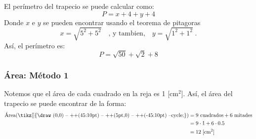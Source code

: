 \documentclass{cdplf-pauta}
\begin{document}
\raggedright
\begin{multicols}{2}

\pregunta
\begin{center}
\end{center}
El perímetro del trapecio se puede calcular como:
\begin{equation*}
    P = x + 4 + y + 4
\end{equation*}
Donde $x$ e $y$ se pueden encontrar usando el teorema de pitagoras
\begin{equation*}
    x = \sqrt{5^2 + 5^2} \quad \textrm{, y tambien,} \quad y = \sqrt{1^2 + 1^2} \;.
\end{equation*}
Así, el perímetro es:
\begin{equation*}
    P = \sqrt{50} + \sqrt{2} + 8
\end{equation*}
\subsubsection{Área: Método 1}
Notemos que el área de cada cuadrado en
la reja es 1 [$\textrm{cm}^2$]. Así, el área del trapecio se puede encontrar 
de la forma:
\setlength{\belowdisplayskip}{0pt}
\setlength{\belowdisplayshortskip}{0pt}
\begin{align*}
    \textrm{Área}(\raisebox{0pt}{\tikz[]{\draw (0,0) -- ++(45:10pt) -- ++(5pt,0) -- ++(-45:10pt) --cycle;}}) &= \textrm{9 cuadrados} + \textrm{6 mitades}\\
                        &= 9\cdot 1 + 6\cdot 0.5 \\
                        &= 12 \; [\textrm{cm}^2] \\
\end{align*}

\end{multicols}
\end{document}
